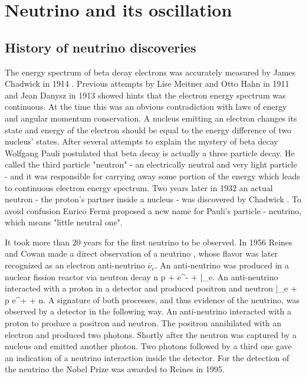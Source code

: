 \chapter{Neutrino and its oscillation}
\label{history_chapter}

\section{History of neutrino discoveries}
The energy spectrum of beta decay electrons was accurately measured by James Chadwick 
in 1914 \cite{chadwick}.  Previous attempts by Lise Meitner and Otto Hahn in 1911 and 
Jean Danysz in 1913 showed hints that the electron energy spectrum was continuous. 
At the time this was an obvious contradiction with laws of energy and angular momentum 
conservation. A nucleus emitting an electron changes its state and energy of the 
electron should be equal to the energy difference of two nucleus' states. After 
several attempts to explain the mystery of beta decay Wolfgang Pauli postulated 
\cite{pauli} that beta decay is actually a three particle decay. He called the third 
particle "neutron" - an electrically neutral and very light particle - and it was 
responsible for carrying away some portion of the energy which leads to continuous 
electron energy spectrum. Two years later in 1932 an actual neutron - the proton's 
partner inside a nucleus - was discovered by Chadwick \cite{chadwick2}.  To avoid 
confusion Enrico Fermi proposed a new name for Pauli's particle \cite{fermi} - 
neutrino, which means "little neutral one".

It took more than 20 years for the first neutrino to be observed.  In 1956 Reines 
and Cowan made a direct observation of a neutrino \cite{cowan}, whose flavor was 
later recognized as an electron anti-neutrino $\bar{\nu}_e$. An anti-neutrino was 
produced in a nuclear fission reactor via neutron decay
\be
n \rightarrow p + e^- + \bar{\nu}_e.
\ee
An anti-neutrino interacted with a proton in a detector and produced positron and neutron
\be
\bar{\nu}_e + p \rightarrow e^+ + n. 
\ee
A signature of both processes, and thus evidence of the neutrino, was observed by 
a detector in the following way. An anti-neutrino interacted with a proton to produce 
a positron and neutron.  The positron annihilated with an electron and produced two 
photons.  Shortly after the neutron was captured by a nucleus and emitted another photon.  
Two photons followed by a third one gave an indication of a neutrino interaction inside 
the detector. For the detection of the neutrino the Nobel Prize was awarded to Reines in 1995.

